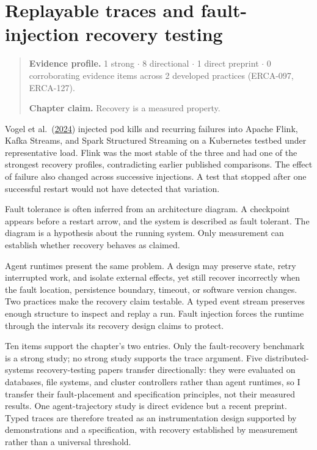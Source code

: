 \chapter{Replayable traces and fault-injection recovery testing}
\label{ch09-replayable-traces-fault-injection-recovery}
\begin{quote}
\textbf{Evidence profile.} 1 strong \(\cdot\) 8 directional \(\cdot\) 1 direct preprint \(\cdot\) 0 corroborating evidence items across 2 developed practices (ERCA-097, ERCA-127).

\textbf{Chapter claim.} Recovery is a measured property.
\end{quote}

Vogel et al.~(\href{https://arxiv.org/abs/2404.06203}{2024}) injected pod kills and recurring failures into Apache Flink, Kafka Streams, and Spark Structured Streaming on a Kubernetes testbed under representative load. Flink was the most stable of the three and had one of the strongest recovery profiles, contradicting earlier published comparisons. The effect of failure also changed across successive injections. A test that stopped after one successful restart would not have detected that variation.

Fault tolerance is often inferred from an architecture diagram. A checkpoint appears before a restart arrow, and the system is described as fault tolerant. The diagram is a hypothesis about the running system. Only measurement can establish whether recovery behaves as claimed.

Agent runtimes present the same problem. A design may preserve state, retry interrupted work, and isolate external effects, yet still recover incorrectly when the fault location, persistence boundary, timeout, or software version changes. Two practices make the recovery claim testable. A typed event stream preserves enough structure to inspect and replay a run. Fault injection forces the runtime through the intervals its recovery design claims to protect.

Ten items support the chapter's two entries. Only the fault-recovery benchmark is a strong study; no strong study supports the trace argument. Five distributed-systems recovery-testing papers transfer directionally: they were evaluated on databases, file systems, and cluster controllers rather than agent runtimes, so I transfer their fault-placement and specification principles, not their measured results. One agent-trajectory study is direct evidence but a recent preprint. Typed traces are therefore treated as an instrumentation design supported by demonstrations and a specification, with recovery established by measurement rather than a universal threshold.

